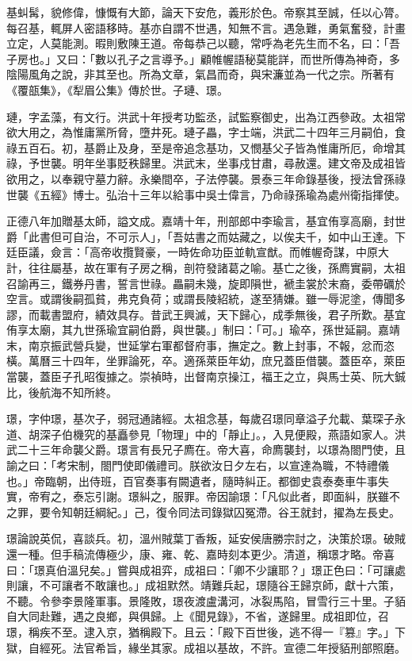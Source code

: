 \begin{pinyinscope}
基虯髯，貌修偉，慷慨有大節，論天下安危，義形於色。帝察其至誠，任以心膂。每召基，輒屏人密語移時。基亦自謂不世遇，知無不言。遇急難，勇氣奮發，計畫立定，人莫能測。暇則敷陳王道。帝每恭己以聽，常呼為老先生而不名，曰：「吾子房也。」又曰：「數以孔子之言導予。」顧帷幄語秘莫能詳，而世所傳為神奇，多陰陽風角之說，非其至也。所為文章，氣昌而奇，與宋濂並為一代之宗。所著有《覆瓿集》，《犁眉公集》傳於世。子璉、璟。

璉，字孟藻，有文行。洪武十年授考功監丞，試監察御史，出為江西參政。太祖常欲大用之，為惟庸黨所脅，墮井死。璉子畾，字士端，洪武二十四年三月嗣伯，食祿五百石。初，基爵止及身，至是帝追念基功，又憫基父子皆為惟庸所厄，命增其祿，予世襲。明年坐事貶秩歸里。洪武末，坐事戍甘肅，尋赦還。建文帝及成祖皆欲用之，以奉親守墓力辭。永樂間卒，子法停襲。景泰三年命錄基後，授法曾孫祿世襲《五經》博士。弘治十三年以給事中吳士偉言，乃命祿孫瑜為處州衛指揮使。

正德八年加贈基太師，謚文成。嘉靖十年，刑部郎中李瑜言，基宜侑享高廟，封世爵「此書但可自治，不可示人」，「吾姑書之而姑藏之，以俟夫千，如中山王達。下廷臣議，僉言：「高帝收攬賢豪，一時佐命功臣並軌宣猷。而帷幄奇謀，中原大計，往往屬基，故在軍有子房之稱，剖符發諸葛之喻。基亡之後，孫廌實嗣，太祖召諭再三，鐵券丹書，誓言世祿。畾嗣未幾，旋即隕世，褫圭裳於末裔，委帶礪於空言。或謂後嗣孤貧，弗克負荷；或謂長陵紹統，遂至猜嫌。雖一辱泥塗，傳聞多謬，而載書盟府，績效具存。昔武王興滅，天下歸心，成季無後，君子所歎。基宜侑享太廟，其九世孫瑜宜嗣伯爵，與世襲。」制曰：「可。」瑜卒，孫世延嗣。嘉靖末，南京振武營兵變，世延掌右軍都督府事，撫定之。數上封事，不報，忿而恣橫。萬曆三十四年，坐罪論死，卒。適孫萊臣年幼，庶兄蓋臣借襲。蓋臣卒，萊臣當襲，蓋臣子孔昭復據之。崇禎時，出督南京操江，福王之立，與馬士英、阮大鋮比，後航海不知所終。

璟，字仲璟，基次子，弱冠通諸經。太祖念基，每歲召璟同章溢子允載、葉琛子永道、胡深子伯機究的基矗參見「物理」中的「靜止」。，入見便殿，燕語如家人。洪武二十三年命襲父爵。璟言有長兄子廌在。帝大喜，命廌襲封，以璟為閤門使，且諭之曰：「考宋制，閤門使即儀禮司。朕欲汝日夕左右，以宣達為職，不特禮儀也。」帝臨朝，出侍班，百官奏事有闕遺者，隨時糾正。都御史袁泰奏車牛事失實，帝宥之，泰忘引謝。璟糾之，服罪。帝因諭璟：「凡似此者，即面糾，朕雖不之罪，要令知朝廷綱紀。」己，復令同法司錄獄囚冤滯。谷王就封，擢為左長史。

璟論說英侃，喜談兵。初，溫州賊葉丁香叛，延安侯唐勝宗討之，決策於璟。破賊還一種。但手稿流傳極少，康、雍、乾、嘉時刻本更少。清道，稱璟才略。帝喜曰：「璟真伯溫兒矣。」嘗與成祖弈，成祖曰：「卿不少讓耶？」璟正色曰：「可讓處則讓，不可讓者不敢讓也。」成祖默然。靖難兵起，璟隨谷王歸京師，獻十六策，不聽。令參李景隆軍事。景隆敗，璟夜渡盧溝河，冰裂馬陷，冒雪行三十里。子貊自大同赴難，遇之良鄉，與俱歸。上《聞見錄》，不省，遂歸里。成祖即位，召璟，稱疾不至。逮入京，猶稱殿下。且云：「殿下百世後，逃不得一『篡』字。」下獄，自經死。法官希旨，緣坐其家。成祖以基故，不許。宣德二年授貊刑部照磨。


\end{pinyinscope}
